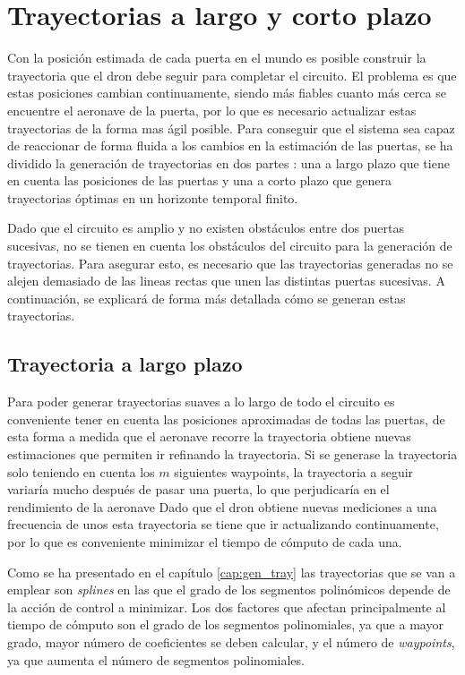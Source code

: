 \section{Trayectorias a largo y corto plazo}

Con la posición estimada de cada puerta en el mundo es posible construir la trayectoria que el dron debe seguir para completar el circuito. El problema es que estas posiciones cambian continuamente, siendo más fiables cuanto más cerca se encuentre el aeronave de la puerta, por lo que es necesario actualizar estas trayectorias de la forma mas ágil posible. Para conseguir que el sistema sea capaz de reaccionar de forma fluida a los cambios en la estimación de las puertas, se ha dividido la generación de trayectorias en dos partes : una a largo plazo que tiene en cuenta las posiciones de las puertas y una a corto plazo que genera trayectorias óptimas en un horizonte temporal finito.

Dado que el circuito es amplio y no existen obstáculos entre dos puertas sucesivas, no se tienen en cuenta los obstáculos del circuito para la generación de trayectorias. Para asegurar esto, es necesario que las trayectorias generadas no se alejen demasiado de las lineas rectas que unen las distintas puertas sucesivas. A continuación, se explicará de forma más detallada cómo se generan estas trayectorias.
\subsection{Trayectoria a largo plazo}

Para poder generar trayectorias suaves a lo largo de todo el circuito es conveniente tener en cuenta las posiciones aproximadas de todas las puertas,  de esta forma a medida que el aeronave recorre la trayectoria obtiene nuevas estimaciones que permiten ir refinando la trayectoria. Si se generase la trayectoria solo teniendo en cuenta los $m$ siguientes waypoints, la trayectoria a seguir variaría mucho después de pasar una puerta, lo que perjudicaría en el rendimiento de la aeronave Dado que el dron obtiene nuevas mediciones a una frecuencia de unos  esta trayectoria se tiene que ir actualizando continuamente, por lo que es conveniente minimizar el tiempo de cómputo de cada una. 

Como se ha presentado en el capítulo \ref{cap:gen_tray} las trayectorias que se van a emplear son \textit{splines} en las que el grado de los segmentos polinómicos depende de la acción de control a minimizar. Los dos factores que afectan principalmente al tiempo de cómputo son el grado de los segmentos polinomiales, ya que a mayor grado, mayor número de coeficientes se deben calcular, y el número de \textit{waypoints}, ya que aumenta el número de segmentos polinomiales.

